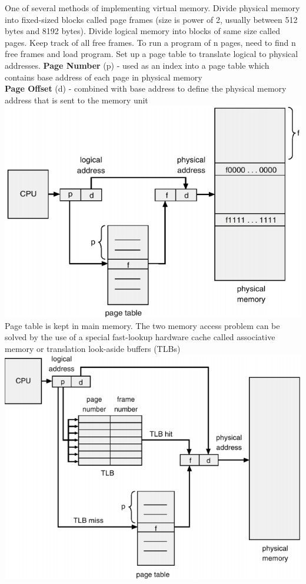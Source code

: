 \documentclass[number]{notes}
\begin{document}
\begin{landscape}
\begin{multicols}{3}
One of several methods of implementing virtual memory. Divide physical memory into fixed-sized blocks called page frames (size is power of 2, usually between 512 bytes and 8192 bytes). Divide logical memory into blocks of same size called pages. Keep track of all free frames. To run a program of n pages, need to find n free frames and load program. Set up a page table to translate logical to physical addresses.
\textbf{Page Number} (p) - used as an index into a page table which contains base address of each page in physical memory\\
\textbf{Page Offset} (d) - combined with base address to define the physical memory address that is sent to the memory unit\\
\includegraphics[width=\linewidth]{pageTable.png}
Page table is kept in main memory. The two memory access problem can be solved by the use of a special fast-lookup hardware cache called associative memory or translation look-aside buffers (TLBs)
\includegraphics[width=\linewidth]{TLB.png}

\end{multicols}
\end{landscape}
\end{document}
